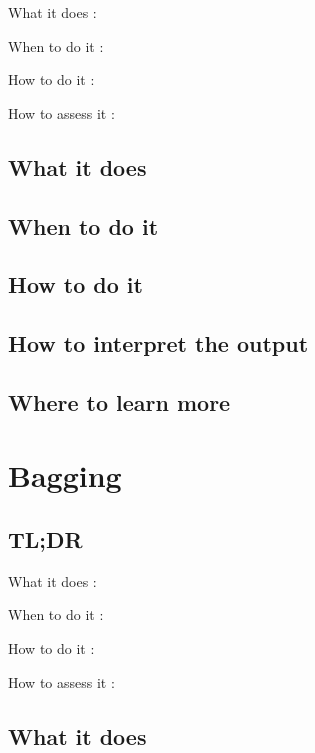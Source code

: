 \documentclass[
]{book}
\begin{document}
What it does
:

When to do it
:

How to do it
:

How to assess it
:

\hypertarget{what-it-does-15}{%
\section{What it does}\label{what-it-does-15}}

\hypertarget{when-to-do-it-15}{%
\section{When to do it}\label{when-to-do-it-15}}

\hypertarget{how-to-do-it-15}{%
\section{How to do it}\label{how-to-do-it-15}}

\hypertarget{how-to-interpret-the-output-15}{%
\section{How to interpret the output}\label{how-to-interpret-the-output-15}}

\hypertarget{where-to-learn-more-15}{%
\section{Where to learn more}\label{where-to-learn-more-15}}

\hypertarget{bagging}{%
\chapter{Bagging}\label{bagging}}

\hypertarget{tldr-16}{%
\section{TL;DR}\label{tldr-16}}

What it does
:

When to do it
:

How to do it
:

How to assess it
:

\hypertarget{what-it-does-16}{%
\section{What it does}\label{what-it-does-16}}
\end{document}
